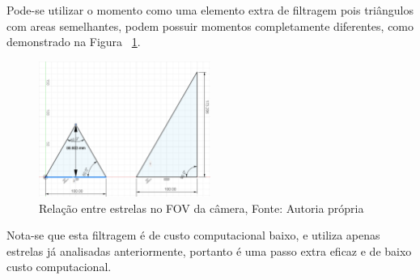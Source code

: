 Pode-se utilizar o momento como uma elemento extra de filtragem pois triângulos com areas semelhantes, podem possuir momentos completamente diferentes, como demonstrado na Figura ~\ref{fig:comparacao_entre_triangulos}.

\begin{figure}[H]
	\centering
	\includegraphics[width=0.5\textwidth]{images/comparacao_entre_triangulos.png}
	\caption{Relação entre estrelas no FOV da câmera, Fonte: Autoria própria}
	\label{fig:comparacao_entre_triangulos}
\end{figure}
Nota-se que esta filtragem é de custo computacional baixo, e utiliza apenas estrelas já analisadas anteriormente, 
portanto é uma passo extra eficaz e de baixo custo computacional.

